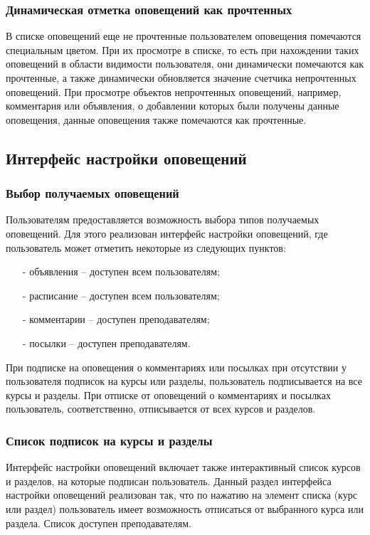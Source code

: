 \documentclass[12pt, a4paper, oneside]{article}
\begin{document}
\subsubsection{Динамическая отметка оповещений как прочтенных}
В списке оповещений еще не прочтенные пользователем оповещения помечаются специальным цветом. При их просмотре в списке, то есть при нахождении таких оповещений в области видимости пользователя, они динамически помечаются как прочтенные, а также динамически обновляется значение счетчика непрочтенных оповещений. При просмотре объектов непрочтенных оповещений, например, комментария или объявления, о добавлении которых были получены данные оповещения, данные оповещения также помечаются как прочтенные.
\subsection{Интерфейс настройки оповещений}
\subsubsection{Выбор получаемых оповещений}
Пользователям предоставляется возможность выбора типов получаемых оповещений. Для этого реализован интерфейс настройки оповещений, где пользователь может отметить некоторые из следующих пунктов:
\begin{itemize}
    \item [-] объявления – доступен всем пользователям;
    \item [-] расписание – доступен всем пользователям;
    \item [-] комментарии – доступен преподавателям;
    \item [-] посылки – доступен преподавателям.
\end{itemize}

При подписке на оповещения о комментариях или посылках при отсутствии у пользователя подписок на курсы или разделы, пользователь подписывается на все курсы и разделы. При отписке от оповещений о комментариях и посылках пользователь, соответственно, отписывается от всех курсов и разделов.
\subsubsection{Список подписок на курсы и разделы}
Интерфейс настройки оповещений включает также интерактивный список курсов и разделов, на которые подписан пользователь. Данный раздел интерфейса настройки оповещений реализован так, что по нажатию на элемент списка (курс или раздел) пользователь имеет возможность отписаться от выбранного курса или раздела. Список доступен преподавателям.
\newpage
\end{document}
